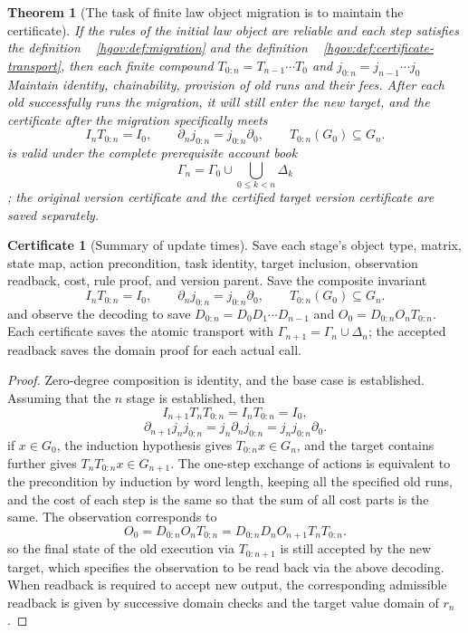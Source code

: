 \documentclass[12pt,a4paper,openany,notitlepage]{report}
\theoremstyle{plain}
\newtheorem{theorem}{Theorem}[chapter]
\theoremstyle{definition}
\newtheorem*{certificate}{Certificate}
\theoremstyle{remark}
\begin{document}
\begin{CJK*}
\begin{theorem}
[The task of finite law object migration is to maintain the certificate]\label{hgov:thm:migration}
If the rules of the initial law object are reliable and each step satisfies the definition ~ \ref{hgov:def:migration} and the definition ~ \ref{hgov:def:certificate-transport}, then each finite compound $T_{0:n}=T_{n-1}\cdots T_0$ and $j_{0:n}=j_{n-1}\cdots j_0$ Maintain identity, chainability, provision of old runs and their fees. After each old successfully runs the migration, it will still enter the new target, and the certificate after the migration specifically meets \[
 I_nT_{0:n}=I_0,\qquad
 \partial_nj_{0:n}=j_{0:n}\partial_0,\qquad
 T_{0:n}(G_0)\subseteq G_n.
\] is valid under the complete prerequisite account book \[
 \Gamma_n=\Gamma_0\cup\bigcup_{0\le k<n}\Delta_k
\]; the original version certificate and the certified target version certificate are saved separately.\end{theorem}
\begin{certificate}
[Summary of update times]Save each stage's object type, matrix, state map, action precondition, task identity, target inclusion, observation readback, cost, rule proof, and version parent. Save the composite invariant \[
I_nT_{0:n}=I_0,\qquad
\partial_nj_{0:n}=j_{0:n}\partial_0,\qquad
T_{0:n}(G_0)\subseteq G_n.
\] and observe the decoding to save $D_{0:n}=D_0D_1\cdots D_{n-1}$ and $O_0=D_{0:n}O_nT_{0:n}$. Each certificate saves the atomic transport with $\Gamma_{n+1}=\Gamma_n\cup\Delta_n$; the accepted readback saves the domain proof for each actual call.\end{certificate}
\begin{proof}
Zero-degree composition is identity, and the base case is established. Assuming that the $n$ stage is established, then \[
I_{n+1}T_nT_{0:n}=I_nT_{0:n}=I_0,
\] \[
\partial_{n+1}j_nj_{0:n}
=j_n\partial_nj_{0:n}=j_nj_{0:n}\partial_0.
\] if $x\in G_0$, the induction hypothesis gives $T_{0:n}x\in G_n$, and the target contains further gives $T_nT_{0:n}x\in G_{n+1}$. The one-step exchange of actions is equivalent to the precondition by induction by word length, keeping all the specified old runs, and the cost of each step is the same so that the sum of all cost parts is the same. The observation corresponds to \[
 O_0
 =D_{0:n}O_nT_{0:n}
 =D_{0:n}D_nO_{n+1}T_nT_{0:n}.
\] so the final state of the old execution via $T_{0:n+1}$ is still accepted by the new target, which specifies the observation to be read back via the above decoding. When readback is required to accept new output, the corresponding admissible readback is given by successive domain checks and the target value domain of $r_n$.


\end{proof}
\end{CJK*}
\end{document}
